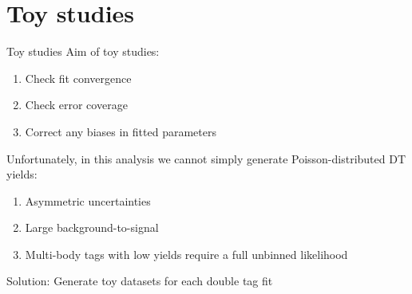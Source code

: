 \documentclass{beamer}
\begin{document}
\section{Toy studies}
\begin{frame}{Toy studies}
  \vspace{0.0cm}
  {\large Aim of toy studies:}
  \begin{enumerate}
    \item{Check fit convergence}
    \item{Check error coverage}
    \item{Correct any biases in fitted parameters}
  \end{enumerate}
  \vspace{0.5cm}
  {\large Unfortunately, in this analysis we cannot simply generate Poisson-distributed DT yields:}
  \begin{enumerate}
    \item{Asymmetric uncertainties}
    \item{Large background-to-signal}
    \item{Multi-body tags with low yields require a full unbinned likelihood}
  \end{enumerate}
  \vspace{0.5cm}
  \begin{center}
    {\Large Solution: Generate toy datasets for each double tag fit}
  \end{center}
\end{frame}
\end{document}
